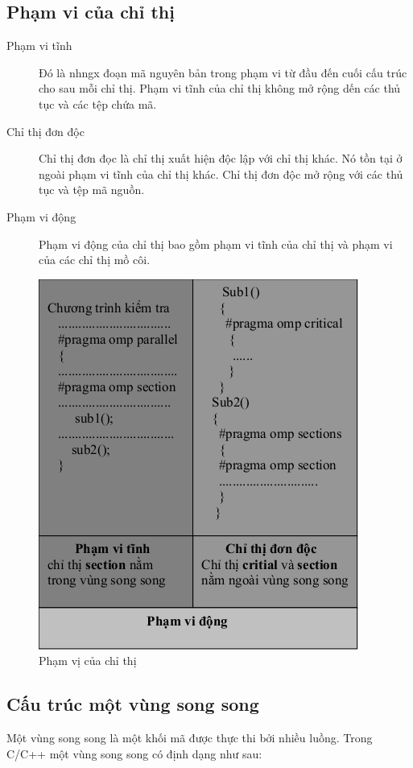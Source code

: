 \documentclass{report}
\begin{document}
\subsection{Phạm vi của chỉ thị}
\begin{description}
\item [Phạm vi tĩnh] Đó là nhngx đoạn mã nguyên bản trong phạm vi từ đầu đến cuối cấu trúc cho sau mỗi chỉ thị. Phạm vi tĩnh của chỉ thị không mở rộng dến các thủ tục và các tệp chứa mã.
\item [Chỉ thị đơn độc] Chỉ thị đơn đọc là chỉ thị xuất hiện độc lập với chỉ thị khác. Nó tồn tại ở ngoài phạm vi tĩnh của chỉ thị khác. Chỉ thị đơn độc mở rộng với các thủ tục và tệp mã nguồn.
\item[Phạm vi động] Phạm vi động của chỉ thị bao gồm phạm vi tĩnh của chỉ thị và phạm vi của các chỉ thị mồ côi.
\end{description}
\begin{figure}[htp]
\centering
\includegraphics[scale=0.5]{img/pic2.png}
\caption{Phạm vị của chỉ thị}
\label{pic_pv_chithi}
\end{figure}

\subsection{Cấu trúc một vùng song song}
Một vùng song song là một khối mã được thực thi bởi nhiều luồng. Trong C/C++ một vùng song song có định dạng như sau:
\end{document}
